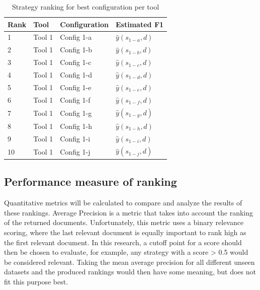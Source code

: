\begin{table}[h]
\centering
\begin{tabular}{|l|l|l|l|}
\hline
\textbf{Rank} & \textbf{Tool} & \textbf{Configuration} & \textbf{Estimated F1} \\ \hline
1             & Tool 1        & Config 1-a             & $\hat{y}(s_{1-a}, d)$ \\ \hline
2             & Tool 1        & Config 1-b             & $\hat{y}(s_{1-b}, d)$ \\ \hline
3             & Tool 1        & Config 1-c             & $\hat{y}(s_{1-c}, d)$ \\ \hline
4             & Tool 1        & Config 1-d             & $\hat{y}(s_{1-d}, d)$ \\ \hline
5             & Tool 1        & Config 1-e             & $\hat{y}(s_{1-e}, d)$ \\ \hline
6             & Tool 1        & Config 1-f             & $\hat{y}(s_{1-f}, d)$ \\ \hline
7             & Tool 1        & Config 1-g             & $\hat{y}(s_{1-g}, d)$ \\ \hline
8             & Tool 1        & Config 1-h             & $\hat{y}(s_{1-h}, d)$ \\ \hline
9             & Tool 1        & Config 1-i             & $\hat{y}(s_{1-i}, d)$ \\ \hline
10            & Tool 1        & Config 1-j             & $\hat{y}(s_{1-j}, d)$ \\ \hline
\end{tabular}
\caption{Strategy ranking for best configuration per tool}
\label{tab:ranking_best_configuration}
\end{table}

\subsection{Performance measure of ranking}
Quantitative metrics will be calculated to compare and analyze the results of these rankings.
Average Precision is a metric that takes into account the ranking of the returned documents. Unfortunately, this metric uses a binary relevance scoring, where the last relevant document is equally important to rank high as the first relevant document. In this research, a cutoff point for a score should then be chosen to evaluate, for example, any strategy with a score > 0.5 would be considered relevant. Taking the mean average precision for all different unseen datasets and the produced rankings would then have some meaning, but does not fit this purpose best.

